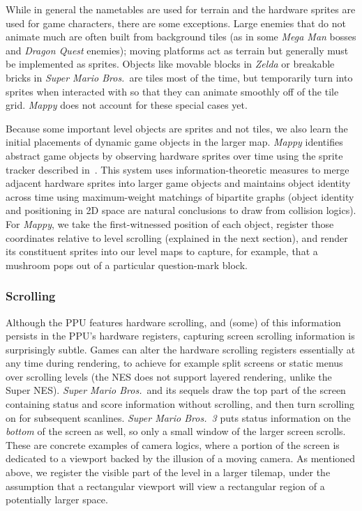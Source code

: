 \documentclass[12pt]{report}
\begin{document}
While in general the nametables are used for terrain and the hardware sprites are used for game characters, there are some exceptions.
Large enemies that do not animate much are often built from background tiles (as in some \emph{Mega Man} bosses and \emph{Dragon Quest} enemies); moving platforms act as terrain but generally must be implemented as sprites.
Objects like movable blocks in \emph{Zelda} or breakable bricks in \emph{Super Mario Bros.}\ are tiles most of the time, but temporarily turn into sprites when interacted with so that they can animate smoothly off of the tile grid.
\emph{Mappy} does not account for these special cases yet.

Because some important level objects are sprites and not tiles, we also learn the initial placements of dynamic game objects in the larger map. \emph{Mappy} identifies abstract game objects by observing hardware sprites over time using the sprite tracker described in~\cite{summerville2017mechanics}.
This system uses information-theoretic measures to merge adjacent hardware sprites into larger game objects and maintains object identity across time using maximum-weight matchings of bipartite graphs (object identity and positioning in 2D space are natural conclusions to draw from collision logics).
For \emph{Mappy}, we take the first-witnessed position of each object, register those coordinates relative to level scrolling (explained in the next section), and render its constituent sprites into our level maps to capture, for example, that a mushroom pops out of a particular question-mark block.

\subsubsection*{Scrolling}

Although the PPU features hardware scrolling, and (some) of this information persists in the PPU's hardware registers, capturing screen scrolling information is surprisingly subtle.
Games can alter the hardware scrolling registers essentially at any time during rendering, to achieve for example split screens or static menus over scrolling levels (the NES does not support layered rendering, unlike the Super NES).
\emph{Super Mario Bros.}\ and its sequels draw the top part of the screen containing status and score information without scrolling, and then turn scrolling on for subsequent scanlines.
\emph{Super Mario Bros.\ 3} puts status information on the \emph{bottom} of the screen as well, so only a small window of the larger screen scrolls.
These are concrete examples of camera logics, where a portion of the screen is dedicated to a viewport backed by the illusion of a moving camera.
As mentioned above, we register the visible part of the level in a larger tilemap, under the assumption that a rectangular viewport will view a rectangular region of a potentially larger space.
\end{document}

